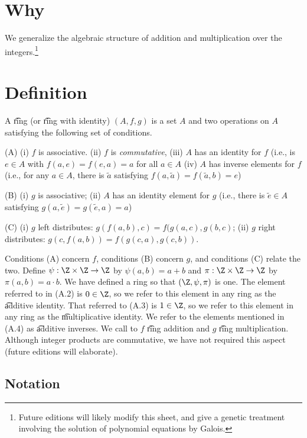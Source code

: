 

\section*{Why}

We generalize the algebraic structure of addition and multiplication over the integers.\footnote{Future editions will likely modify this sheet, and give a genetic treatment involving the solution of polynomial equations by Galois.}

\section*{Definition}

A \t{ring} (or \t{ring with identity}) $(A, f, g)$ is a set $A$ and two operations on $A$ satisfying the following set of conditions.

(A)
(i) $f$ is associative.
(ii) $f$ is \textit{commutative},
(iii) $A$ has an identity for $f$ (i.e., is $e \in A$ with $f(a, e) = f(e, a) = a$ for all $a \in A$
(iv) $A$ has inverse elements for $f$ (i.e., for any $a \in A$, there is $\tilde{a} $ satisfying $f(a,\tilde{a}) = f(\tilde{a}, b) = e$)

(B)
(i) $g$ is associative;
(ii) $A$ has an identity element for $g$ (i.e., there is $\tilde{e} \in A$ satisfying $g(a, \tilde{e}) = g(\tilde{e},a) = a$)

(C)
(i) $g$ left distributes: $g(f(a, b), c) = f(g(a,c), g(b,c)$;
(ii) $g$ right distributes: $g(c,f(a,b)) = f(g(c,a), g(c,b))$.

Conditions (A) concern $f$, conditions (B) concern $g$, and conditions (C) relate the two.
Define $\psi : \Z  \times  \Z  \to \Z $ by $\psi (a, b) = a+b$ and $\pi : \Z  \times  \Z  \to \Z $ by $\pi(a, b) = a\cdot b$.
We have defined a ring so that $(\Z , \psi , \pi )$ is one.
The element referred to in (A.2) is $0 \in \Z $, so we refer to this element in any ring as the \t{additive identity}.
That referred to (A.3) is $1 \in \Z $, so we refer to this element in any ring as the \t{multiplicative identity}.
We refer to the elements mentioned in (A.4) as \t{additive inverses}.
We call to $f$ \t{ring addition} and $g$ \t{ring multiplication}.
Although integer products are commutative, we have not required this aspect (future editions will elaborate).

\subsection*{Notation}

